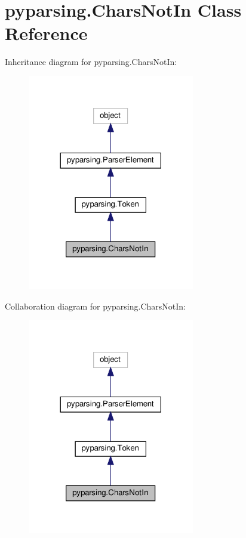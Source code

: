 \hypertarget{classpyparsing_1_1CharsNotIn}{}\section{pyparsing.\+Chars\+Not\+In Class Reference}
\label{classpyparsing_1_1CharsNotIn}


Inheritance diagram for pyparsing.\+Chars\+Not\+In\+:
\nopagebreak
\begin{figure}[H]
\begin{center}
\leavevmode
\includegraphics[width=206pt]{classpyparsing_1_1CharsNotIn__inherit__graph}
\end{center}
\end{figure}


Collaboration diagram for pyparsing.\+Chars\+Not\+In\+:
\nopagebreak
\begin{figure}[H]
\begin{center}
\leavevmode
\includegraphics[width=206pt]{classpyparsing_1_1CharsNotIn__coll__graph}
\end{center}
\end{figure}
